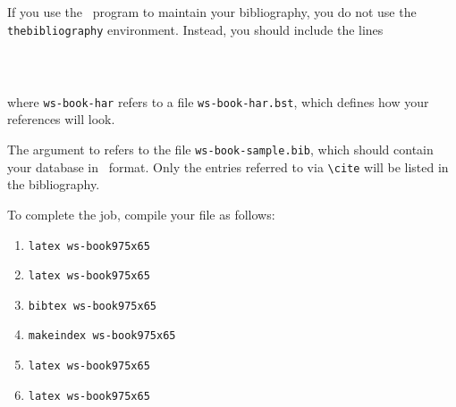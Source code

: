 \section{\btex}\index{\btex}
If you use the \btex\ program to maintain your bibliography, you do
not use the \verb|thebibliography| environment. Instead, you should
include the lines

\begin{verbatim}
   
   
\end{verbatim}

\noindent where \verb|ws-book-har| refers to a file
\verb|ws-book-har.bst|, which defines how your references will look.

The argument to \verb|| refers to the file \verb|ws-book-sample.bib|,
which should contain your database in \btex\ format. Only the
entries referred to via \verb|\cite| will be listed in the
bibliography.

To complete the job, compile your file as follows:

\begin{enumerate}[(6)]
\item \verb|latex ws-book975x65|
\item \verb|latex ws-book975x65|
\item \verb|bibtex ws-book975x65|
\item \verb|makeindex ws-book975x65|
\item \verb|latex ws-book975x65|
\item \verb|latex ws-book975x65|
\end{enumerate}
